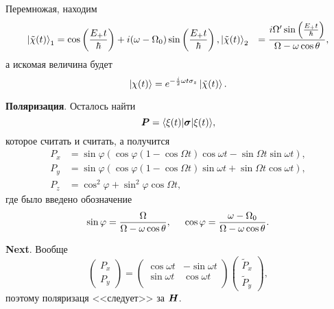 Перемножая, находим
\begin{align*}
    \left| \tilde{\chi}(t) \right\rangle_1 &= \cos \left(\frac{E_+ t}{\hbar}\right) + i  (\omega - \Omega_0) \sin \left(\frac{E_+ t}{\hbar}\right),
    \left| \tilde{\chi}(t) \right\rangle_2 &=  \frac{i \Omega' \sin \left(\frac{E_+ t}{\hbar}\right)}{\Omega - \omega \cos \theta},
\end{align*}
а искомая величина будет 
\begin{equation*}
    \left| \chi(t) \right\rangle = e^{- \frac{i}{2} \omega t \sigma_z} \left| \tilde{\chi}(t) \right\rangle.
\end{equation*}


\textbf{Поляризация}. Осталось найти
\begin{equation*}
    \vc{P} = \bk{\xi(t)}[\vc{\sigma}]{\xi(t)},
\end{equation*}
которое считать и считать, а получится
\begin{align*}
    P_x &= \sin \varphi \left(
        \cos \varphi (1 - \cos \Omega t) \cos \omega t - \sin \Omega t \sin \omega t
    \right), \\
    P_y &= \sin \varphi \left(
        \cos \varphi (1 - \cos \Omega t) \sin \omega t + \sin \Omega t \cos \omega t
    \right), \\
    P_z &= \cos^2 \varphi + \sin^2 \varphi \cos \Omega t,
\end{align*}
где было введено обозначение
\begin{equation*}
    \sin \varphi = \frac{\Omega}{\Omega - \omega \cos \theta},
    \hspace{5 mm} 
    \cos \varphi = \frac{\omega - \Omega_0}{\Omega - \omega \cos \theta}.
\end{equation*}

\textbf{Next}. Вообще
\begin{equation*}
    \begin{pmatrix}
        P_x \\ P_y
    \end{pmatrix} = \begin{pmatrix}
        \cos \omega t & - \sin \omega t  \\
        \sin \omega t & \cos \omega t  \\
    \end{pmatrix} \begin{pmatrix}
        \tilde{P}_x \\ \tilde{P}_y
    \end{pmatrix},
\end{equation*}
поэтому поляризаця <<следует>> за $\mbox{\boldmath $H$}$.


